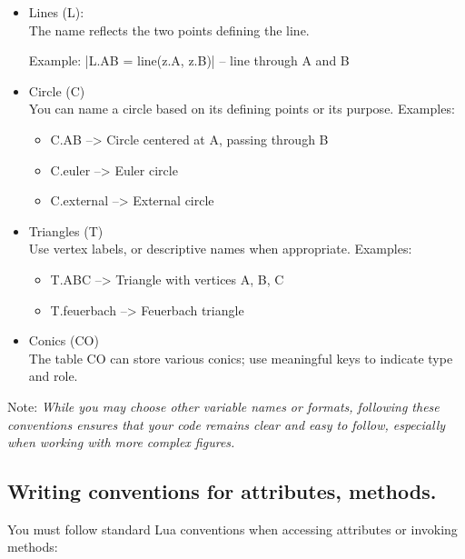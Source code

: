 \begin{itemize}
  \item Lines (L):\\
  The name reflects the two points defining the line.

   Example: |L.AB = line(z.A, z.B)| -- line through A and B

\item Circle (C)\\
You can name a circle based on its defining points or its purpose.
Examples:
\begin{itemize}
 \item C.AB       --> Circle centered at A, passing through B
 \item C.euler    --> Euler circle
 \item C.external --> External circle
\end{itemize}

\item Triangles (T)\\
Use vertex labels, or descriptive names when appropriate. Examples:

\begin{itemize}
  \item T.ABC         --> Triangle with vertices A, B, C
  \item T.feuerbach   --> Feuerbach triangle

\end{itemize}



\item Conics (CO)\\
The table CO can store various conics; use meaningful keys to indicate type and role.


\end{itemize}

Note: \emph{While you may choose other variable names or formats, following these conventions ensures that your code remains clear and easy to follow, especially when working with more complex figures.}

\subsection{Writing conventions for attributes, methods.}
\label{sub:writing_conventions_for_attributes_methods_and_functions}

You must follow standard Lua conventions when accessing attributes or invoking methods:

